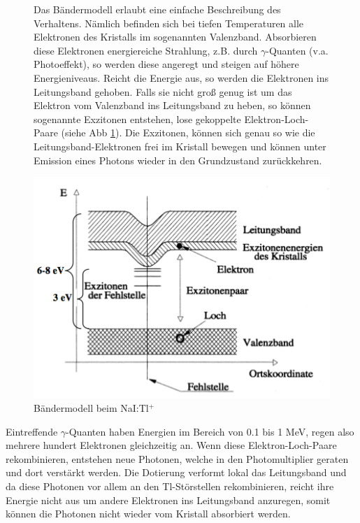\begin{figure}[H]
	\begin{minipage}{0.45\textwidth}
	Das Bändermodell erlaubt eine einfache Beschreibung des Verhaltens. Nämlich befinden sich bei tiefen Temperaturen alle Elektronen des Kristalls im sogenannten Valenzband. Absorbieren diese Elektronen energiereiche Strahlung, z.B. durch $\gamma$-Quanten (v.a. Photoeffekt), so werden diese angeregt und steigen auf höhere Energieniveaus. Reicht die Energie aus, so werden die Elektronen ins Leitungsband gehoben. Falls sie nicht groß genug ist um das Elektron vom Valenzband ins Leitungsband zu heben, so können sogenannte Exzitonen entstehen, lose gekoppelte Elektron-Loch-Paare (siehe Abb \ref{baendermodellszinti}). Die Exzitonen, können sich genau so wie die Leitungsband-Elektronen frei im Kristall bewegen und können unter Emission eines Photons wieder in den Grundzustand zurückkehren. 
	\end{minipage}
	\begin{minipage}{0.54\textwidth}
	\centering \includegraphics[width=\textwidth]{BilderTheorie/Bandmodell.png}
	\caption{Bändermodell beim NaI:Tl$^+$}
	\label{baendermodellszinti}
	\end{minipage}
\end{figure}
Eintreffende $\gamma$-Quanten haben Energien im Bereich von 0.1 bis 1 MeV, regen also mehrere hundert Elektronen gleichzeitig an. Wenn diese Elektron-Loch-Paare rekombinieren, entstehen neue Photonen, welche in den Photomultiplier geraten und dort verstärkt werden. Die Dotierung verformt lokal das Leitungsband und da diese Photonen vor allem an den Tl-Störstellen rekombinieren, reicht ihre Energie nicht aus um andere Elektronen ins Leitungsband anzuregen, somit können die Photonen nicht wieder vom Kristall absorbiert werden.


